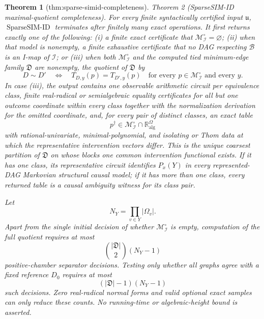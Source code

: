 \documentclass{article}
\newtheorem{theorem}{Theorem}
\begin{document}
\begin{theorem}[thm:sparse-simid-completeness]\label{thm:sparse-simid-completeness}
Theorem 2 (SparseSIM-ID maximal-quotient completeness).  For every finite syntactically certified input \(\mathfrak u\), \(\operatorname{SparseSIM\text{-}ID}\) terminates after finitely many exact operations.  It first returns exactly one of the following: (i) a finite exact certificate that \(\mathcal M_{\mathcal I}^{\circ}=\varnothing\); (ii) when that model is nonempty, a finite exhaustive certificate that no DAG respecting \(\mathcal B\) is an I-map of \(\mathcal I\); or (iii) when both \(\mathcal M_{\mathcal I}^{\circ}\) and the computed tied minimum-edge family \(\mathfrak D\) are nonempty, the quotient of \(\mathfrak D\) by
\[
 D\sim D'
 \quad\Longleftrightarrow\quad
 T_{D,y}(p)=T_{D',y}(p)
 \quad\text{for every }p\in\mathcal M_{\mathcal I}^{\circ}
 \text{ and every }y. \tag{11}
\]
In case (iii), the output contains one observable arithmetic circuit per equivalence class, finite real-radical or semialgebraic equality certificates for all but one outcome coordinate within every class together with the normalization derivation for the omitted coordinate, and, for every pair of distinct classes, an exact table
\[
 p^\dagger\in\mathcal M_{\mathcal I}^{\circ}\cap\mathbb R_{\mathrm{alg}}^\Omega
\]
with rational-univariate, minimal-polynomial, and isolating or Thom data at which the representative intervention vectors differ.  This is the unique coarsest partition of \(\mathfrak D\) on whose blocks one common intervention functional exists.  If it has one class, its representative circuit identifies \(P_x(Y)\) in every represented-DAG Markovian structural causal model; if it has more than one class, every returned table is a causal ambiguity witness for its class pair.

Let
\[
 N_Y=\prod_{v\in Y}|\Omega_v|.
\]
Apart from the single initial decision of whether \(\mathcal M_{\mathcal I}^{\circ}\) is empty, computation of the full quotient requires at most
\[
 \binom{|\mathfrak D|}{2}(N_Y-1) \tag{12}
\]
positive-chamber separator decisions.  Testing only whether all graphs agree with a fixed reference \(D_0\) requires at most
\[
 (|\mathfrak D|-1)(N_Y-1) \tag{13}
\]
such decisions.  Zero real-radical normal forms and valid optional exact samples can only reduce these counts.  No running-time or algebraic-height bound is asserted.
\end{theorem}
\end{document}

